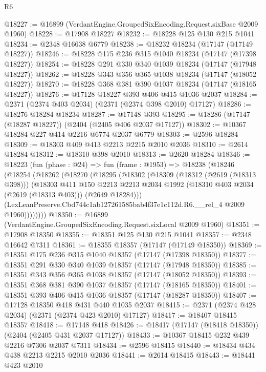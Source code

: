\begin{lexlean}{R6}
\begin{coremodule}
@18227 := @16899 (VerdantEngine.GroupedSixEncoding.Request.sixBase @2009 @1960)
@18228 := @17908 @18227
@18232 := @18228 @125 @130 @215 @1041
@18234 := @2348 @16638 @6779
@18238 := @18232 @18234 (@17147 (@17149 @18227))
@18246 := @18228 @175 @236 @315 @1040 @18234 (@17147 (@17398 @18227))
@18254 := @18228 @291 @330 @340 @1039 @18234 (@17147 (@17948 @18227))
@18262 := @18228 @343 @356 @365 @1038 @18234 (@17147 (@18052 @18227))
@18270 := @18228 @368 @381 @390 @1037 @18234 (@17147 (@18165 @18227))
@18276 := @17128 @18227 @393 @406 @415 @1036 @2037
@18284 := @2371 (@2374 @403 @2034) (@2371 (@2374 @398 @2010) @17127)
@18286 := @18276 @18284 @18234
@18287 := @17148 @393
@18295 := @18286 (@17147 (@18287 @18227)) (@2404 (@2405 @406 @2037 @17127))
@18302 := @10367 @18284 @227 @414 @2216 @6774 @2037 @6779
@18303 := @2596 @18284
@18309 := @18303 @409 @413 @2213 @2215 @2010 @2036
@18310 := @2614 @18284
@18312 := @18310 @398 @2010
@18313 := @2620 @18284
@18346 := @18223
    (fun (phase : @24) =>
    fun (frame : @1953) =>
    @18238
      (@18246
        (@18254
          (@18262
            (@18270
              (@18295
                (@18302
                  (@18309
                    (@18312 (@2619 (@18313 @398)))
                    (@18303
                      @411
                      @150
                      @2213
                      @2213
                      @2034
                      @1992
                      (@18310 @403 @2034 (@2619 (@18313 @403)))
                      (@2649 @18284)))
                  (LexLeanPreserve.Cbd744c1ab127261585bab4f37e1c112d.R6.__rel_4 @2009 @1960))))))))
@18350 := @16899 (VerdantEngine.GroupedSixEncoding.Request.sixLocal @2009 @1960)
@18351 := @17908 @18350
@18355 := @18351 @125 @130 @215 @1041
@18357 := @2348 @16642 @7311
@18361 := @18355 @18357 (@17147 (@17149 @18350))
@18369 := @18351 @175 @236 @315 @1040 @18357 (@17147 (@17398 @18350))
@18377 := @18351 @291 @330 @340 @1039 @18357 (@17147 (@17948 @18350))
@18385 := @18351 @343 @356 @365 @1038 @18357 (@17147 (@18052 @18350))
@18393 := @18351 @368 @381 @390 @1037 @18357 (@17147 (@18165 @18350))
@18401 := @18351 @393 @406 @415 @1036 @18357 (@17147 (@18287 @18350))
@18407 := @17128 @18350 @418 @431 @440 @1035 @2037
@18415 := @2371 (@2374 @428 @2034) (@2371 (@2374 @423 @2010) @17127)
@18417 := @18407 @18415 @18357
@18418 := @17148 @418
@18426 := @18417 (@17147 (@18418 @18350)) (@2404 (@2405 @431 @2037 @17127))
@18433 := @10367 @18415 @232 @439 @2216 @7306 @2037 @7311
@18434 := @2596 @18415
@18440 := @18434 @434 @438 @2213 @2215 @2010 @2036
@18441 := @2614 @18415
@18443 := @18441 @423 @2010

\end{coremodule}
\end{lexlean}

